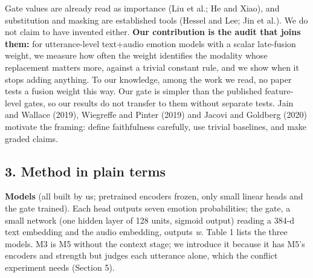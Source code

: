 \documentclass[
  10pt,
]{article}
\begin{document}
Gate values are already read as importance (Liu et al.; He and Xiao),
and substitution and masking are established tools (Hessel and Lee; Jin
et al.). We do not claim to have invented either. \textbf{Our
contribution is the audit that joins them:} for utterance-level
text+audio emotion models with a scalar late-fusion weight, we measure
how often the weight identifies the modality whose replacement matters
more, against a trivial constant rule, and we show when it stops adding
anything. To our knowledge, among the work we read, no paper tests a
fusion weight this way. Our gate is simpler than the published
feature-level gates, so our results do not transfer to them without
separate tests. Jain and Wallace (2019), Wiegreffe and Pinter (2019) and
Jacovi and Goldberg (2020) motivate the framing: define faithfulness
carefully, use trivial baselines, and make graded claims.

\subsection{3. Method in plain terms}\label{method-in-plain-terms}

\textbf{Models} (all built by us; pretrained encoders frozen, only small
linear heads and the gate trained). Each head outputs seven emotion
probabilities; the gate, a small network (one hidden layer of 128 units,
sigmoid output) reading a 384-d text embedding and the audio embedding,
outputs \emph{w}. Table 1 lists the three models. M3 is M5 without the
context stage; we introduce it because it has M5's encoders and strength
but judges each utterance alone, which the conflict experiment needs
(Section 5).
\end{document}
